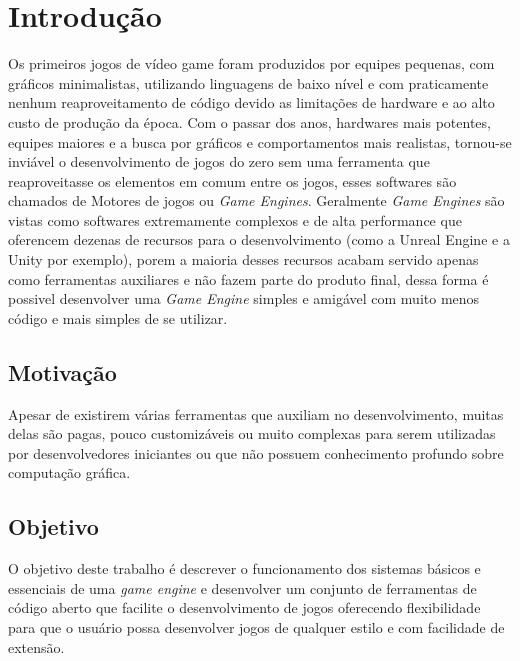 \documentclass[12pt,	openright, twoside,	a4paper, english, french, spanish, brazil]{abntex2}
\begin{document}
\chapter[Introdução]{Introdução}
Os primeiros jogos de vídeo game foram produzidos por equipes pequenas, com gráficos minimalistas, utilizando linguagens de baixo nível e com praticamente nenhum reaproveitamento de código devido as limitações de hardware e ao alto custo de produção da época. Com o passar dos anos, hardwares mais potentes, equipes maiores e a busca por gráficos e comportamentos mais realistas, tornou-se inviável o desenvolvimento de jogos do zero sem uma ferramenta que reaproveitasse os elementos em comum entre os jogos, esses softwares são chamados de Motores de jogos ou \textit{Game Engines}. Geralmente \textit{Game Engines} são vistas como softwares extremamente complexos e de alta performance que oferencem dezenas de recursos para o desenvolvimento (como a Unreal Engine e a Unity por exemplo), porem a maioria desses recursos acabam servido apenas como ferramentas auxiliares e não fazem parte do produto final, dessa forma é possivel desenvolver uma \textit{Game Engine} simples e amigável com muito menos código e mais simples de se utilizar.

%
%

\section{Motivação}
Apesar de existirem várias ferramentas que auxiliam no desenvolvimento, muitas delas são pagas, pouco customizáveis ou muito complexas para serem utilizadas por desenvolvedores iniciantes ou que não possuem conhecimento profundo sobre computação gráfica.

%
%

\section{Objetivo}
O objetivo deste trabalho é descrever o funcionamento dos sistemas básicos e essenciais de uma \textit{game engine} e desenvolver um conjunto de ferramentas de código aberto que facilite o desenvolvimento de jogos oferecendo flexibilidade para que o usuário possa desenvolver jogos de qualquer estilo e com facilidade de extensão.
\end{document}
